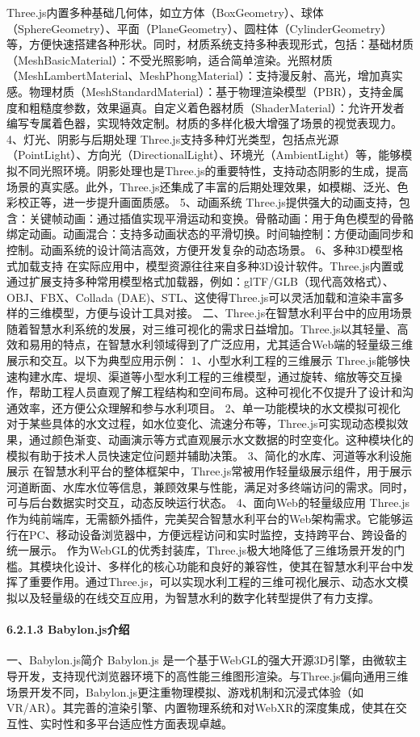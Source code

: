 Three.js内置多种基础几何体，如立方体（BoxGeometry）、球体（SphereGeometry）、平面（PlaneGeometry）、圆柱体（CylinderGeometry）等，方便快速搭建各种形状。同时，材质系统支持多种表现形式，包括：基础材质（MeshBasicMaterial）：不受光照影响，适合简单渲染。光照材质（MeshLambertMaterial、MeshPhongMaterial）：支持漫反射、高光，增加真实感。物理材质（MeshStandardMaterial）：基于物理渲染模型（PBR），支持金属度和粗糙度参数，效果逼真。自定义着色器材质（ShaderMaterial）：允许开发者编写专属着色器，实现特效定制。材质的多样化极大增强了场景的视觉表现力。 4、灯光、阴影与后期处理 Three.js支持多种灯光类型，包括点光源（PointLight）、方向光（DirectionalLight）、环境光（AmbientLight）等，能够模拟不同光照环境。阴影处理也是Three.js的重要特性，支持动态阴影的生成，提高场景的真实感。此外，Three.js还集成了丰富的后期处理效果，如模糊、泛光、色彩校正等，进一步提升画面质感。 5、动画系统 Three.js提供强大的动画支持，包含：关键帧动画：通过插值实现平滑运动和变换。骨骼动画：用于角色模型的骨骼绑定动画。动画混合：支持多动画状态的平滑切换。时间轴控制：方便动画同步和控制。动画系统的设计简洁高效，方便开发复杂的动态场景。 6、多种3D模型格式加载支持 在实际应用中，模型资源往往来自多种3D设计软件。Three.js内置或通过扩展支持多种常用模型格式加载器，例如：glTF/GLB（现代高效格式）、OBJ、FBX、Collada (DAE)、STL、这使得Three.js可以灵活加载和渲染丰富多样的三维模型，方便与设计工具对接。 二、Three.js在智慧水利平台中的应用场景 随着智慧水利系统的发展，对三维可视化的需求日益增加。Three.js以其轻量、高效和易用的特点，在智慧水利领域得到了广泛应用，尤其适合Web端的轻量级三维展示和交互。以下为典型应用示例： 1、小型水利工程的三维展示 Three.js能够快速构建水库、堤坝、渠道等小型水利工程的三维模型，通过旋转、缩放等交互操作，帮助工程人员直观了解工程结构和空间布局。这种可视化不仅提升了设计和沟通效率，还方便公众理解和参与水利项目。 2、单一功能模块的水文模拟可视化 对于某些具体的水文过程，如水位变化、流速分布等，Three.js可实现动态模拟效果，通过颜色渐变、动画演示等方式直观展示水文数据的时空变化。这种模块化的模拟有助于技术人员快速定位问题并辅助决策。 3、简化的水库、河道等水利设施展示 在智慧水利平台的整体框架中，Three.js常被用作轻量级展示组件，用于展示河道断面、水库水位等信息，兼顾效果与性能，满足对多终端访问的需求。同时，可与后台数据实时交互，动态反映运行状态。 4、面向Web的轻量级应用 Three.js作为纯前端库，无需额外插件，完美契合智慧水利平台的Web架构需求。它能够运行在PC、移动设备浏览器中，方便远程访问和实时监控，支持跨平台、跨设备的统一展示。 作为WebGL的优秀封装库，Three.js极大地降低了三维场景开发的门槛。其模块化设计、多样化的核心功能和良好的兼容性，使其在智慧水利平台中发挥了重要作用。通过Three.js，可以实现水利工程的三维可视化展示、动态水文模拟以及轻量级的在线交互应用，为智慧水利的数字化转型提供了有力支撑。 \paragraph{6.2.1.3 Babylon.js介绍}\label{babylon.jsux4ecbux7ecd} 一、Babylon.js简介 Babylon.js 是一个基于WebGL的强大开源3D引擎，由微软主导开发，支持现代浏览器环境下的高性能三维图形渲染。与Three.js偏向通用三维场景开发不同，Babylon.js更注重物理模拟、游戏机制和沉浸式体验（如VR/AR）。其完善的渲染引擎、内置物理系统和对WebXR的深度集成，使其在交互性、实时性和多平台适应性方面表现卓越。 